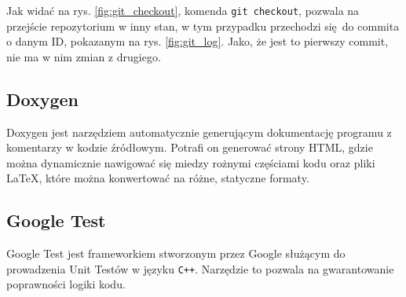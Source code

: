 Jak widać na rys. \ref{fig:git_checkout}, komenda \texttt{git checkout}, pozwala na przejście repozytorium w inny stan, w tym przypadku przechodzi się do commita o danym ID, pokazanym na rys. \ref{fig:git_log}. Jako, że jest to pierwszy commit, nie ma w nim zmian z drugiego.

\subsection{Doxygen}
Doxygen\cite{doxygensite} jest narzędziem automatycznie generującym dokumentację programu z komentarzy w kodzie źródłowym. Potrafi on generować strony HTML, gdzie można dynamicznie nawigować się miedzy rożnymi częściami kodu oraz pliki \LaTeX, które można konwertować na różne, statyczne formaty.

\subsection{Google Test}
Google Test \cite{gtestrepo} jest frameworkiem stworzonym przez Google służącym do prowadzenia Unit Testów w języku \texttt{C++}. Narzędzie to pozwala na gwarantowanie poprawności logiki kodu.
